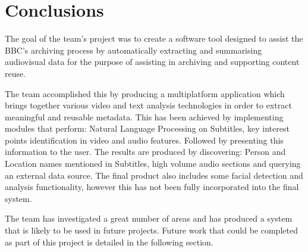 \section{Conclusions}
The goal of the team’s project was to create a software tool designed to assist the BBC's archiving process by automatically extracting and summarising 
audiovisual data for the purpose of assisting in archiving and supporting content reuse.

The team accomplished this by producing a multiplatform application which brings together various video and text analysis technologies in order to 
extract meaningful and reusable metadata. This has been achieved by implementing modules that perform: Natural Language Processing on Subtitles, key 
interest points identification in video and audio features. Followed by presenting this information to the user. The results are produced by discovering: 
Person and Location names mentioned in Subtitles, high volume audio sections and querying an external data source. The final product also includes some 
facial detection and analysis functionality, however this has not been fully incorporated into the final system.

The team has investigated a great number of areas and has produced a system that is likely to be used in future projects. Future work that could be 
completed as part of this project is detailed in the following section.